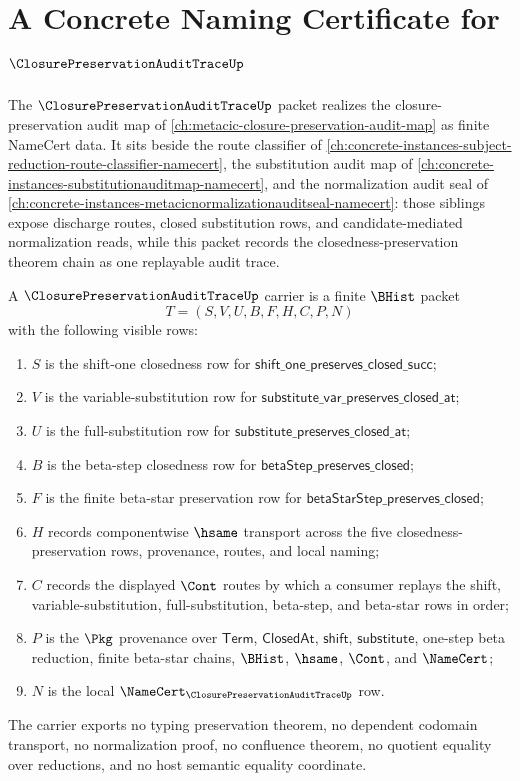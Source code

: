 \chapter{A Concrete Naming Certificate for $\ClosurePreservationAuditTraceUp$}
\label{ch:concrete-instances-closurepreservationaudittrace-namecert}

The $\ClosurePreservationAuditTraceUp$ packet realizes the closure-preservation audit map of \autoref{ch:metacic-closure-preservation-audit-map} as finite NameCert data. It sits beside the route classifier of \autoref{ch:concrete-instances-subject-reduction-route-classifier-namecert}, the substitution audit map of \autoref{ch:concrete-instances-substitutionauditmap-namecert}, and the normalization audit seal of \autoref{ch:concrete-instances-metacicnormalizationauditseal-namecert}: those siblings expose discharge routes, closed substitution rows, and candidate-mediated normalization reads, while this packet records the closedness-preservation theorem chain as one replayable audit trace.

\begin{definition}
\label{def:closure-preservation-audit-trace-carrier}
A $\ClosurePreservationAuditTraceUp$ carrier is a finite $\BHist$ packet
$$
T=(S,V,U,B,F,H,C,P,N)
$$
with the following visible rows:
\begin{enumerate}
\item $S$ is the shift-one closedness row for $\mathsf{shift\_one\_preserves\_closed\_succ}$;
\item $V$ is the variable-substitution row for $\mathsf{substitute\_var\_preserves\_closed\_at}$;
\item $U$ is the full-substitution row for $\mathsf{substitute\_preserves\_closed\_at}$;
\item $B$ is the beta-step closedness row for $\mathsf{betaStep\_preserves\_closed}$;
\item $F$ is the finite beta-star preservation row for $\mathsf{betaStarStep\_preserves\_closed}$;
\item $H$ records componentwise $\hsame$ transport across the five closedness-preservation rows, provenance, routes, and local naming;
\item $C$ records the displayed $\Cont$ routes by which a consumer replays the shift, variable-substitution, full-substitution, beta-step, and beta-star rows in order;
\item $P$ is the $\Pkg$ provenance over $\mathsf{Term}$, $\mathsf{ClosedAt}$, $\mathsf{shift}$, $\mathsf{substitute}$, one-step beta reduction, finite beta-star chains, $\BHist$, $\hsame$, $\Cont$, and $\NameCert$;
\item $N$ is the local $\NameCert_{\ClosurePreservationAuditTraceUp}$ row.
\end{enumerate}
The carrier exports no typing preservation theorem, no dependent codomain transport, no normalization proof, no confluence theorem, no quotient equality over reductions, and no host semantic equality coordinate.
\end{definition}

